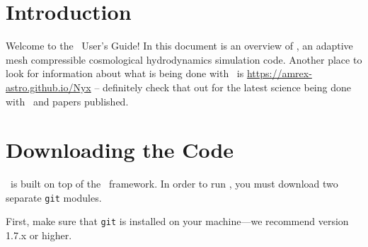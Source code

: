 
\section{Introduction}

Welcome to the \nyx\ User's Guide!  In this document is an overview of \nyx, an adaptive mesh
compressible cosmological hydrodynamics simulation code.
Another place to look for information about what is being done with \nyx\ is
{\url{https://amrex-astro.github.io/Nyx}} -- definitely check that out for
the latest science being done with \nyx\ and papers published.

\section{Downloading the Code}

\nyx\ is built on top of the \amrex\ framework.  In order to run
\nyx, you must download two separate {\tt git} modules.

\vspace{.1in}

\noindent First, make sure that {\tt git} is installed on your machine---we recommend version 1.7.x or higher.

\vspace{.1in}

